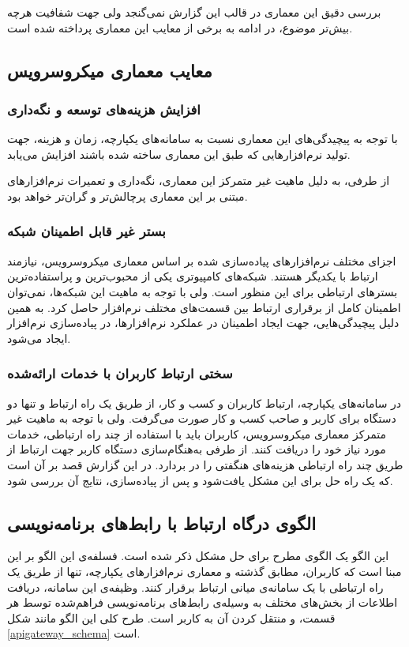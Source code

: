 بررسی دقیق این معماری در قالب این گزارش نمی‌گنجد ولی جهت شفافیت هرچه بیش‌تر موضوع، در ادامه به برخی از معایب این معماری پرداخته شده‌ است.

\subsection{معایب معماری میکروسرویس}\label{subsec:intro_microissues}
\subsubsection{افزایش هزینه‌های توسعه و نگه‌داری}
با توجه به پیچیدگی‌های این معماری نسبت به سامانه‌های یکپارچه، زمان و هزینه، جهت تولید نرم‌افزار‌هایی که طبق این معماری ساخته شده باشند افزایش می‌یابد.

از طرفی، به دلیل ماهیت غیر متمرکز این معماری، نگه‌داری و تعمیرات نرم‌افزار‌های مبتنی بر این معماری پرچالش‌تر و گران‌تر خواهد بود.

\subsubsection{بستر غیر قابل اطمینان شبکه}
اجزای مختلف نرم‌افزار‌های پیاده‌سازی شده بر اساس معماری میکروسرویس، نیازمند ارتباط‌ با یکدیگر هستند. شبکه‌های کامپیوتری یکی از محبوب‌ترین و پراستفاده‌ترین بستر‌های ارتباطی برای این منظور است. ولی با توجه به ماهیت این شبکه‌ها، نمی‌توان اطمینان کامل از برقراری ارتباط بین قسمت‌های مختلف نرم‌افزار حاصل کرد. به همین دلیل پیچیدگی‌هایی، جهت ایجاد اطمینان در عملکرد نرم‌افزار‌ها، در پیاده‌سازی نرم‌افزار ایجاد می‌شود.

\subsubsection{سختی ارتباط کاربران با خدمات ارائه‌شده}
در سامانه‌های یکپارچه، ارتباط کاربران و کسب و کار، از طریق یک راه ارتباط و تنها دو دستگاه برای کاربر و صاحب کسب و کار صورت می‌گرفت. ولی با توجه به ماهیت غیر متمرکز معماری میکروسرویس، کاربران باید با استفاده‌ از چند راه ارتباطی، خدمات مورد نیاز خود را دریافت کنند. از طرفی به‌هنگام‌سازی دستگاه کاربر جهت ارتباط از طریق چند راه ارتباطی هزینه‌های هنگفتی را در بر‌دارد. در این گزارش قصد بر آن است که یک راه حل برای این مشکل یافت‌شود و پس از پیاده‌سازی، نتایج آن بررسی شود.

\subsection{الگوی درگاه ارتباط با رابط‌های برنامه‌نویسی}
این الگو یک الگوی مطرح برای حل مشکل ذکر شده است.
\cite{nginx}
فسلفه‌ی این الگو بر این مبنا است که کاربران، مطابق گذشته و معماری نرم‌افزار‌های یکپارچه، تنها از طریق یک راه ارتباطی با یک سامانه‌ی میانی ارتباط برقرار کنند. وظیفه‌ی این سامانه‌، دریافت اطلاعات از بخش‌های مختلف به وسیله‌ی رابط‌های برنامه‌نویسی فراهم‌شده توسط هر قسمت، و منتقل کردن آن به کاربر است. طرح کلی این الگو مانند شکل
\ref{apigateway_schema}
 است.

